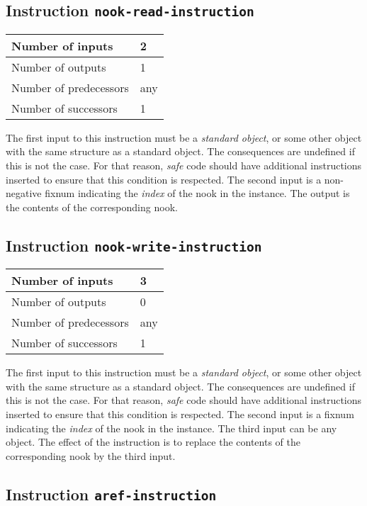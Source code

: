 \subsection{Instruction \texttt{nook-read-instruction}}
\label{hir-instruction-nook-read}

\begin{tabular}{|l|l|}
\hline
Number of inputs & 2\\
\hline
Number of outputs & 1\\
\hline
Number of predecessors & any\\
\hline
Number of successors & 1\\
\hline
\end{tabular}

The first input to this instruction must be a \emph{standard object},
or some other object with the same structure as a standard object.
The consequences are undefined if this is not the case.  For that
reason, \emph{safe} code should have additional instructions inserted
to ensure that this condition is respected.  The second input is a
non-negative fixnum indicating the \emph{index} of the nook in the
instance.  The output is the contents of the corresponding nook.

\subsection{Instruction \texttt{nook-write-instruction}}
\label{hir-instruction-nook-write}

\begin{tabular}{|l|l|}
\hline
Number of inputs & 3\\
\hline
Number of outputs & 0\\
\hline
Number of predecessors & any\\
\hline
Number of successors & 1\\
\hline
\end{tabular}

The first input to this instruction must be a \emph{standard object},
or some other object with the same structure as a standard object.
The consequences are undefined if this is not the case.  For that
reason, \emph{safe} code should have additional instructions inserted
to ensure that this condition is respected.  The second input is a
fixnum indicating the \emph{index} of the nook in the instance.  The
third input can be any object.  The effect of the instruction is to
replace the contents of the corresponding nook by the third input.

\subsection{Instruction \texttt{aref-instruction}}
\label{hir-instruction-aref}

